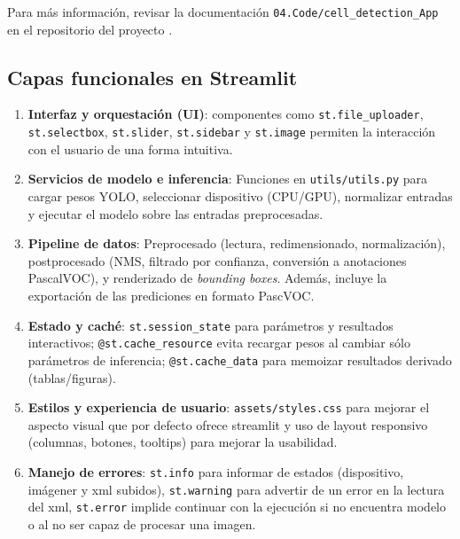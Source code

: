 \documentclass[12pt,a4paper,onecolumn,oneside]{report}
\begin{document}
Para más información, revisar la documentación \texttt{04.Code/cell\_detection\_App} en el repositorio del proyecto \cite{repoTFM}.

\subsection{Capas funcionales en Streamlit}
\begin{enumerate}
  \item \textbf{Interfaz y orquestación (UI)}: componentes como \texttt{st.file\_uploader}, \texttt{st.selectbox}, \texttt{st.slider}, \texttt{st.sidebar} y \texttt{st.image} permiten la interacción con el usuario de una forma intuitiva.
  \item \textbf{Servicios de modelo e inferencia}: Funciones en \texttt{utils/utils.py} para cargar pesos YOLO, seleccionar dispositivo (CPU/GPU), normalizar entradas y ejecutar el modelo sobre las entradas preprocesadas.
  \item \textbf{Pipeline de datos}: Preprocesado (lectura, redimensionado, normalización), postprocesado (NMS, filtrado por confianza, conversión a anotaciones PascalVOC), y renderizado de \textit{bounding boxes}. 
  Además, incluye la exportación de las prediciones en formato PascVOC. 
  \item \textbf{Estado y caché}: \texttt{st.session\_state} para parámetros y resultados interactivos; \texttt{@st.cache\_resource} evita recargar 
  pesos al cambiar sólo parámetros de inferencia; \texttt{@st.cache\_data} para memoizar resultados derivado (tablas/figuras).
  \item \textbf{Estilos y experiencia de usuario}: \texttt{assets/styles.css} para mejorar el aspecto visual que por defecto ofrece streamlit y uso de layout 
  responsivo (columnas, botones, tooltips) para mejorar la usabilidad.
  \item \textbf{Manejo de errores}: \texttt{st.info} para informar de estados (dispositivo, imágener y xml subidos), \texttt{st.warning} para advertir de un error en la lectura del xml, 
  \texttt{st.error} implide continuar con la ejecución si no encuentra modelo o al no ser capaz de procesar una imagen.
\end{enumerate}
\end{document}
